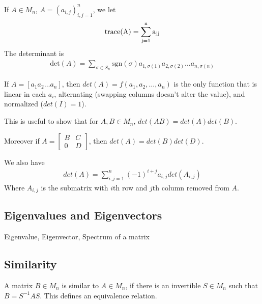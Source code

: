 

\begin{definition}
  If $A \in M_n$, $A = (a_{i, j})_{i, j = 1}^n$, we let
  \begin{align*}
    \rm{trace}(A) = \sum_{j = 1}^{n} a_{jj}
  \end{align*}
  The determinant is
  \begin{align*}
    \textrm{det}(A) = \sum_{ \sigma \in  S_n} \textrm{sgn}(\sigma)
    a_{1, \sigma(1)} a_{2, \sigma(2)} \ldots a_{n, \sigma(n)}
  \end{align*}
\end{definition}

\begin{remark}
  If $A = [a_1  a_2  \ldots  a_n]$, then $det(A) = f( a_1 , a_2 ,
  \ldots , a_n)$ is the only function that is linear in each $a_i$,
  alternating (swapping columns doesn't alter the value), and
  normalized ($det(I) = 1$).

  This is useful to show that for $A, B \in M_n$, $det(AB) = det(A) det(B)$.

  Moreover if $A =
  \begin{bmatrix}
    B & C \\
    0 & D
  \end{bmatrix}$, then $det(A) = det(B) det(D)$.

  We also have
  \begin{align*}
    det(A) = \sum_{i, j = 1}^{n} (-1)^{i + j} a_{i, j} det(A_{i, j})
  \end{align*}
  Where $A_{i, j}$ is the submatrix with $i$th row and $j$th column
  removed from $A$.
\end{remark}

\subsection{Eigenvalues and Eigenvectors}

\begin{definition}
  Eigenvalue, Eigenvector, Spectrum of a matrix
\end{definition}

\subsection{Similarity}

\begin{definition}
  A matrix $B \in M_n$ is similar to $A \in M_n$, if there is an
  invertible $S \in M_n$ such that $B = S^{-1}AS$. This defines an
  equivalence relation.
\end{definition}

